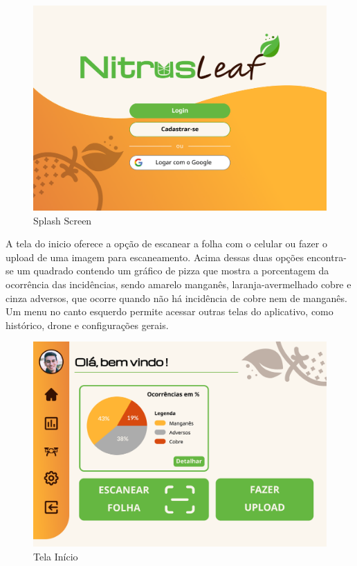 \documentclass[
    a4paper,%
    12pt,%
    english,%
    brazilian,%
]{article}
\begin{document}
\begin{figure}[H]
\centering
\caption{Splash Screen}%
\label{fig:splash-screen}
\includegraphics[width=0.8\linewidth]{Logos/Splash-Screen.png}
\end{figure}

A tela do inicio  oferece a opção de escanear a folha com o celular ou fazer o upload de uma imagem para escaneamento. Acima dessas duas opções encontra-se um quadrado contendo um gráfico de pizza que mostra a porcentagem da ocorrência das incidências, sendo amarelo manganês, laranja-avermelhado cobre e cinza adversos, que ocorre quando não há incidência de cobre nem de manganês. Um menu no canto esquerdo permite acessar outras telas do aplicativo, como histórico, drone e configurações gerais.

\begin{figure}[H]
\centering
\caption{Tela Início}%
\label{fig:tela-inicio}
\includegraphics[width=0.8\linewidth]{Logos/tela-inicio.png}
\end{figure}
\end{document}
